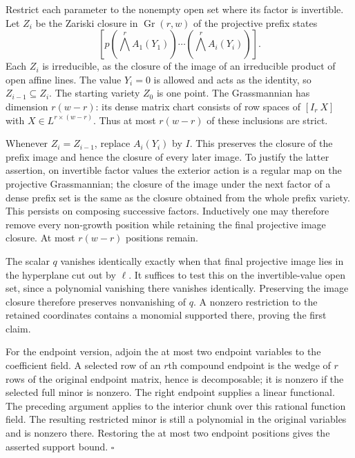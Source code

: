 \documentclass[11pt,a4paper]{article}
\theoremstyle{definition}\newtheorem{definition}{Definition}
\begin{document}
Restrict each parameter to the nonempty open set where its
factor is invertible.  Let $Z_i$ be the Zariski closure in
$\operatorname{Gr}(r,w)$ of the projective prefix states
\[
 [p(\textstyle\bigwedge^r A_1(Y_1))\cdots
        (\textstyle\bigwedge^r A_i(Y_i))].
\]
Each $Z_i$ is irreducible, as the closure of the image of an
irreducible product of open affine lines.  The value $Y_i=0$
is allowed and acts as the identity, so
$Z_{i-1}\subseteq Z_i$.  The starting variety $Z_0$ is one
point.  The Grassmannian has dimension $r(w-r)$: its dense
matrix chart consists of row spaces of $[I_r\ X]$ with
$X\in L^{r\times(w-r)}$.
Thus at most $r(w-r)$ of these inclusions are strict.

Whenever $Z_i=Z_{i-1}$, replace $A_i(Y_i)$ by $I$.
This preserves the closure of the prefix image and hence the
closure of every later image.  To justify the latter assertion,
on invertible factor values the exterior action is a regular
map on the projective Grassmannian; the closure of the image
under the next factor of a dense prefix set is the same as
the closure obtained from the whole prefix variety.  This
persists on composing successive factors.  Inductively one
may therefore remove every non-growth position while retaining
the final projective image closure.  At most $r(w-r)$ positions
remain.

The scalar $q$ vanishes identically exactly when that final
projective image lies in the hyperplane cut out by $\ell$.
It suffices to test this on the invertible-value open set,
since a polynomial vanishing there vanishes identically.
Preserving the image closure therefore preserves nonvanishing
of $q$.  A nonzero restriction to the retained coordinates
contains a monomial supported there, proving the first claim.

For the endpoint version, adjoin the at most two endpoint
variables to the coefficient field.  A selected row of an
$r$th compound endpoint is the wedge of $r$ rows of the
original endpoint matrix, hence is decomposable; it is nonzero
if the selected full minor is nonzero.  The right endpoint
supplies a linear functional.  The preceding argument applies
to the interior chunk over this rational function field.
The resulting restricted minor is still a polynomial in the
original variables and is nonzero there.  Restoring the at
most two endpoint positions gives the asserted support bound.
\hfill$\square$
\end{document}
